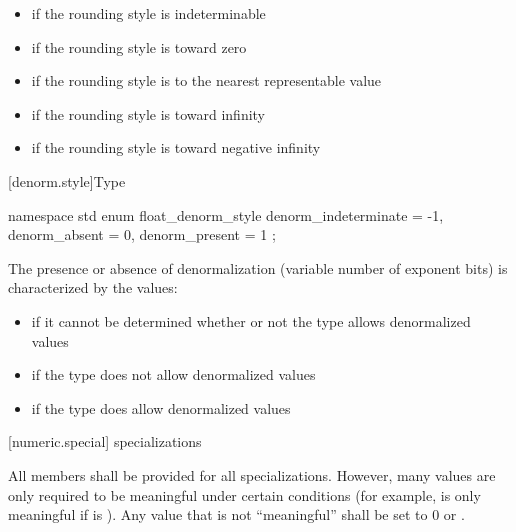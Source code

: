 \begin{itemize}
\item
{}%
if the rounding style is indeterminable
\item
{}%
if the rounding style is toward zero
\item
{}%
if the rounding style is to the nearest representable value
\item
{}%
if the rounding style is toward infinity
\item
{}%
if the rounding style is toward negative infinity
\end{itemize}

[denorm.style]{Type }

%
\begin{codeblock}
namespace std {
  enum float_denorm_style {
    denorm_indeterminate = -1,
    denorm_absent = 0,
    denorm_present = 1
  };
}
\end{codeblock}

\pnum
The presence or absence of denormalization (variable number of exponent bits)
is characterized by the values:

\begin{itemize}
\item
{}%
if it cannot be determined whether or not the type allows denormalized values
\item
{}%
if the type does not allow denormalized values
\item
{}%
if the type does allow denormalized values
\end{itemize}

[numeric.special]{ specializations}

\pnum
All members shall be provided for all specializations.
However, many values are only required to be meaningful under certain
conditions
(for example,
is only meaningful if
is
).
Any value that is not ``meaningful'' shall be set to 0 or
.

